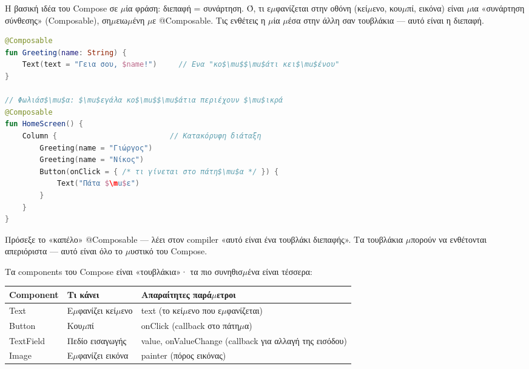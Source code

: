 


Η βασική ιδέα του Compose σε $\mu$ία φράση: διεπαφή = συνάρτηση. Ό, τι ε$\mu$φανίζεται στην οθόνη (κεί$\mu$ενο, κου$\mu$πί, εικόνα) είναι $\mu$ια «συνάρτηση σύνθεσης» (Composable), ση$\mu$ειω$\mu$ένη $\mu$ε @Composable. Τις ενθέτεις η $\mu$ία $\mu$έσα στην άλλη σαν τουβλάκια — αυτό είναι η διεπαφή.

\begin{lstlisting}[language=Kotlin]
@Composable
fun Greeting(name: String) {
    Text(text = "Γεια σου, $name!")     // Ενα "κο$\mu$$\mu$άτι κει$\mu$ένου"
}

// Φωλιάσ$\mu$α: $\mu$εγάλα κο$\mu$$\mu$άτια περιέχουν $\mu$ικρά
@Composable
fun HomeScreen() {
    Column {                          // Κατακόρυφη διάταξη
        Greeting(name = "Γιώργος")
        Greeting(name = "Νίκος")
        Button(onClick = { /* τι γίνεται στο πάτη$\mu$α */ }) {
            Text("Πάτα $\mu$ε")
        }
    }
}
\end{lstlisting}

Πρόσεξε το «καπέλο» @Composable — λέει στον compiler «αυτό είναι ένα τουβλάκι διεπαφής». Τα τουβλάκια $\mu$πορούν να ενθέτονται απεριόριστα — αυτό είναι όλο το $\mu$υστικό του Compose.


Τα components του Compose είναι «τουβλάκια»· τα πιο συνηθισ$\mu$ένα είναι τέσσερα:

\begin{center}
\begin{tabularx}{\linewidth}{|X|X|X|}
\hline
\textbf{Component} & \textbf{Τι κάνει} & \textbf{Απαραίτητες παρά$\mu$ετροι} \tabularnewline
\hline
Text & Ε$\mu$φανίζει κεί$\mu$ενο & text (το κεί$\mu$ενο που ε$\mu$φανίζεται) \tabularnewline
Button & Κου$\mu$πί & onClick (callback στο πάτη$\mu$α) \tabularnewline
TextField & Πεδίο εισαγωγής & value, onValueChange (callback για αλλαγή της εισόδου) \tabularnewline
Image & Ε$\mu$φανίζει εικόνα & painter (πόρος εικόνας) \tabularnewline
\hline
\end{tabularx}
\end{center}

